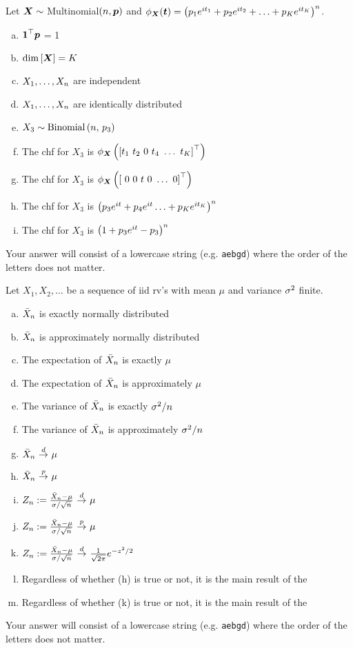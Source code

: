 \documentclass[12pt,landscape]{article}
\newcommand{\instr}{\small Your answer will consist of a lowercase string (e.g. \texttt{aebgd}) where the order of the letters does not matter. \normalsize}
\begin{document}

\problem{} Let $\boldsymbol{X} \sim$ Multinomial$(n, \boldsymbol{p})$ and $\phi_{\boldsymbol{X}}(\boldsymbol{t}) = \left(p_1 e^{i t_1} + p_2 e^{i t_2} + \ldots + p_K e^{i t_K}\right)^{n}$.

\vspace{-0.2cm}\benum{} 

\begin{enumerate}[(a)]
\item $\boldsymbol{1}^\top \boldsymbol{p}$ = 1
\item $\text{dim}\left[\boldsymbol{X}\right] = K$
\item $X_1, \ldots, X_n$ are independent
\item $X_1, \ldots, X_n$ are identically distributed
\item $X_3 \sim \mathrm{Binomial}\left(n,\,p_3\right)$
\item The chf for $X_3$ is $\phi_{\boldsymbol{X}}\left(\left[t_1~t_2~0~t_4~\ldots~t_K\right]^\top\right)$
\item The chf for $X_3$ is $\phi_{\boldsymbol{X}}\left(\left[~0~0~t~0~\ldots~0\right]^\top\right)$
\item The chf for $X_3$ is $\left(p_3 e^{i t} + p_4 e^{i t} \ldots + p_K e^{i t_K}\right)^{n}$
\item The chf for $X_3$ is $\left(1 + p_3 e^{i t}  - p_3 \right)^{n}$
\end{enumerate}
\eenum\instr\pagebreak


\problem{} Let $X_1, X_2, \ldots$ be a sequence of iid rv's with mean $\mu$ and variance $\sigma^2$ finite.

\vspace{-0.2cm}\benum{} 

\begin{enumerate}[(a)]
\item $\bar{X}_n$ is exactly normally distributed
\item $\bar{X}_n$ is approximately normally distributed
\item The expectation of $\bar{X}_n$ is exactly $\mu$
\item The expectation of $\bar{X}_n$ is approximately $\mu$
\item The variance of $\bar{X}_n$ is exactly $\sigma^2 / n$
\item The variance of $\bar{X}_n$ is approximately $\sigma^2 / n$
\item $\Xbar_n \convd \mu$
\item $\Xbar_n \convp \mu$
\item $Z_n := \frac{\Xbar_n - \mu}{\sigma / \sqrt{n}} \convd \mu$
\item $Z_n := \frac{\Xbar_n - \mu}{\sigma / \sqrt{n}} \convp \mu$
\item $Z_n := \frac{\Xbar_n - \mu}{\sigma / \sqrt{n}} \convd \oneoversqrt{2\pi}e^{-z^2/2}$
\item Regardless of whether (h) is true or not, it is the main result of the 
\item Regardless of whether (k) is true or not, it is the main result of the 
\end{enumerate}
\eenum\instr\pagebreak
\end{document}
